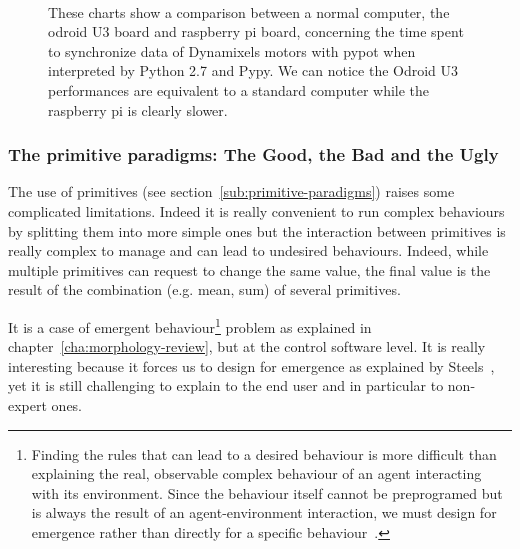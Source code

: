 \begin{figure}[tb]
\centering
    \\
    \hfill
    \caption{These charts show a comparison between a normal computer, the odroid U3 board and raspberry pi board, concerning the time spent to synchronize data of Dynamixels motors with pypot when interpreted by Python 2.7 and Pypy. We can notice the Odroid U3 performances are equivalent to a standard computer while the raspberry pi is clearly slower.}
    \label{fig:pypot-run}
\end{figure}



\subsubsection{The primitive paradigms: The Good, the Bad and the Ugly}
\label{sec:pypot-primitives-problems}

The use of primitives (see section~\ref{sub:primitive-paradigms}) raises some complicated limitations. Indeed it is really convenient to run complex behaviours by splitting them into more simple ones but the interaction between primitives is really complex to manage and can lead to undesired behaviours. Indeed, while multiple primitives can request to change the same value, the final value is the result of the combination (e.g. mean, sum) of several primitives.


It is a case of emergent behaviour\footnote{Finding the rules that can lead to a desired behaviour is more difficult than explaining the real, observable complex behaviour of an agent interacting with its environment. Since the behaviour itself cannot be preprogramed but is always the result of an agent-environment interaction, we must design for emergence rather than directly for a specific behaviour~\parencite{Pfeifer06}.} problem as explained in chapter~\ref{cha:morphology-review}, but at the control software level. It is really interesting because it forces us to design  for emergence as explained by Steels~\parencite{Steels1991emergence}, yet it is still challenging to explain to the end user and in particular to non-expert ones.


